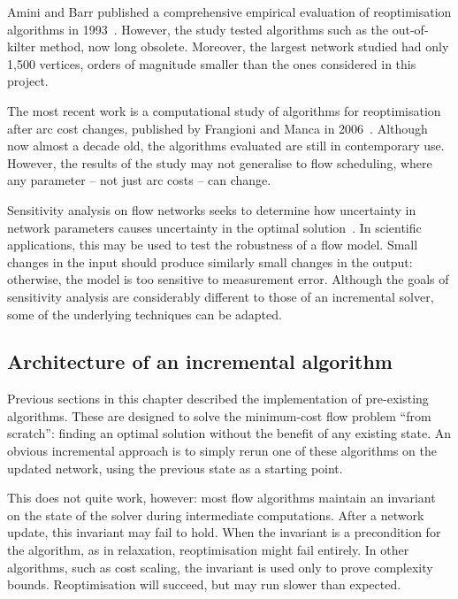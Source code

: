Amini and Barr published a comprehensive empirical evaluation of reoptimisation algorithms in 1993~\cite{Amini:1993}. However, the study tested algorithms such as the out-of-kilter method, now long obsolete. Moreover, the largest network studied had only 1,500 vertices, orders of magnitude smaller than the ones considered in this project. 

The most recent work is a computational study of algorithms for reoptimisation after arc cost changes, published by Frangioni and Manca in 2006~\cite{Frangioni:2006}. Although now almost a decade old, the algorithms evaluated are still in contemporary use. However, the results of the study may not generalise to flow scheduling, where any parameter -- not just arc costs -- can change. 

Sensitivity analysis on flow networks seeks to determine how uncertainty in network parameters causes uncertainty in the optimal solution~\cite[\S9.11]{Ahuja:1993}. In scientific applications, this may be used to test the robustness of a flow model. Small changes in the input should produce similarly small changes in the output: otherwise, the model is too sensitive to measurement error. Although the goals of sensitivity analysis are considerably different to those of an incremental solver, some of the underlying techniques can be adapted.

\subsection{Architecture of an incremental algorithm} \label{sec:impl-incremental-architecture}

Previous sections in this chapter described the implementation of pre-existing algorithms. These are designed to solve the minimum-cost flow problem ``from scratch'': finding an optimal solution without the benefit of any existing state. An obvious incremental approach is to simply rerun one of these algorithms on the updated network, using the previous state as a starting point.

This does not quite work, however: most flow algorithms maintain an invariant on the state of the solver during intermediate computations. After a network update, this invariant may fail to hold. When the invariant is a precondition for the algorithm, as in relaxation, reoptimisation might fail entirely. In other algorithms, such as cost scaling, the invariant is used only to prove complexity bounds. Reoptimisation will succeed, but may run slower than expected.

